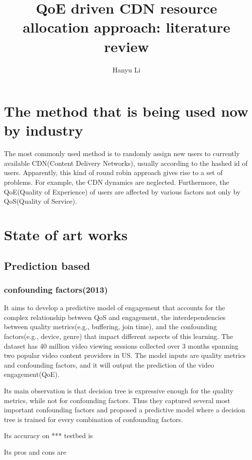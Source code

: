 \documentclass{ctexart}
\title{QoE driven CDN resource allocation approach: literature review}
\author{Hanyu Li}
\begin{document}
\maketitle
\section{The method that is being used now by industry}
The most commonly used method is to randomly assign new users to currently available CDN(Content Delivery Networks), usually according to the hashed id of users. Apparently, this kind of round robin approach gives rise to a set of problems. For example, the CDN dynamics are neglected. Furthermore, the QoE(Quality of Experience) of users are affected by various factors not only by QoS(Quality of Service).
\section{State of art works}
\subsection{Prediction based}
\subsubsection{confounding factors(2013)\cite{DBLP:conf/sigcomm/BalachandranSASSZ13}}
\par It aims to develop a predictive model of engagement that accounts for the complex relationship between QoS and engagement, the interdependencies between quality metrics(e.g., buffering, join time), and the confounding factors(e.g., device, genre) that impact different aspects of this learning. The dataset has 40 million video viewing sessions collected over 3 months spanning two popular video content providers in US. The model inputs are quality metrics and confounding factors, and it will output the prediction of the video engagement(QoE).
\par Its main observation is that decision tree is expressive enough for the quality metrics, while not for confounding factors. Thus they captured several most important confounding factors and proposed a predictive model where a decision tree is trained for every combination of confounding factors. 
\par Its accuracy on *** testbed is 
\par Its pros and cons are
\end{document}
